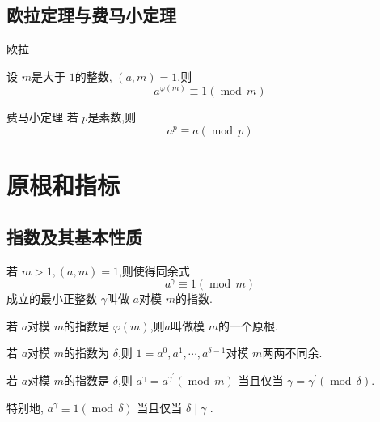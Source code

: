 \documentclass[lang=cn,12pt,color=green,fontset=none]{elegantbook}
\begin{document}
\section{欧拉定理与费马小定理}

\begin{theorem}{欧拉 }

    设 \(  m  \)是大于 \(  1  \)的整数, \(  \left( a,m \right)= 1   \),则 \[
    a^{\varphi \left( m \right) }\equiv 1\left( \operatorname{mod}\,m \right) 
    \]   
\end{theorem}

\begin{theorem}{费马小定理}
    若 \(  p  \)是素数,则 \[
    a^{p}\equiv a\left( \operatorname{mod}\,p \right) 
    \] 
\end{theorem}

\chapter{原根和指标}

\section{指数及其基本性质}

\begin{definition}
    若 \(  m>1,\left( a,m \right)= 1   \),则使得同余式 \[
    a^{ \gamma } \equiv 1\left( \operatorname{mod}\,m \right) 
    \]成立的最小正整数 \(   \gamma   \)叫做 \(  a  \)对模 \(  m  \)的指数.    

    若 \(  a  \)对模 \(  m  \)的指数是 \(  \varphi \left( m \right)   \),则\(  a  \)叫做模 \(  m  \)的一个原根.     
\end{definition}

\begin{theorem}
    若 \(  a  \)对模 \(  m  \)的指数为 \(   \delta   \),则 \(  1=  a^0,a^1,\cdots,a^{\delta -1}  \)对模 \(  m  \)两两不同余.     
\end{theorem}

\begin{theorem}
    若 \(  a  \)对模 \(  m  \)的指数是 \(   \delta   \),则 \(  a^{ \gamma } =  a^{ \gamma ^{\prime} }\left( \operatorname{mod}\,m \right)   \)   当且仅当 \(   \gamma =  \gamma ^{\prime} \left( \operatorname{mod}\,\delta  \right)   \).
    
    特别地, \(  a^{ \gamma }\equiv 1\left( \operatorname{mod}\, \delta  \right)   \) 当且仅当 \( \delta \mid   \gamma   \) .
\end{theorem}
\end{document}
